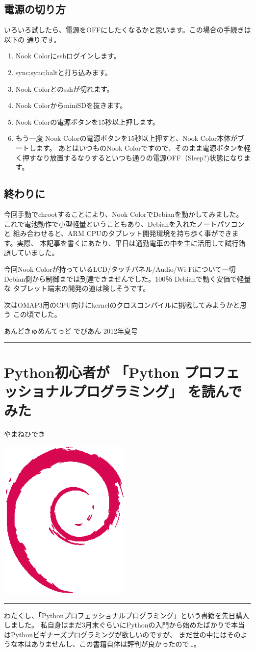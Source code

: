 \documentclass[mingoth,a4paper]{jsarticle}
\renewcommand{\dancersection}[2]{%
\newpage
あんどきゅめんてっど でびあん 2012年夏号
%
\vspace{0.1mm}\\
{\color{dancerdarkblue}\rule{\hsize}{2mm}}

%
%
\begin{minipage}[t]{0.6\hsize}
\color{dancerdarkblue}
\vspace{1cm}
\section{#1}
\hfill{}#2\\
\end{minipage}
\begin{minipage}[t]{0.4\hsize}
\vspace{-2cm}
\hfill{}\includegraphics[height=8cm]{image200502/openlogo-nd.eps}\\
\vspace{-5cm}
\end{minipage}
%
{\color{dancerlightblue}\rule{0.66\hsize}{2mm}}
%
\vspace{2cm}
}
\begin{document}
\subsection{電源の切り方}

いろいろ試したら、電源をOFFにしたくなるかと思います。この場合の手続きは以下の
通りです。

\begin{enumerate}
\item Nook Colorにsshログインします。
\item sync;sync;haltと打ち込みます。
\item Nook Colorとのsshが切れます。
\item Nook ColorからminiSDを抜きます。
\item Nook Colorの電源ボタンを15秒以上押します。
\item もう一度 Nook Colorの電源ボタンを15秒以上押すと、Nook Color本体がブートします。
あとはいつものNook Colorですので、そのまま電源ボタンを軽く押すなり放置するなりするといつも通りの電源OFF（Sleep?)状態になります。
\end{enumerate}

\subsection{終わりに}

今回手動でchrootすることにより、Nook ColorでDebianを動かしてみました。
これで電池動作で小型軽量ということもあり、Debianを入れたノートパソコンと
組み合わせると、ARM CPUのタブレット開発環境を持ち歩く事ができます。実際、
本記事を書くにあたり、平日は通勤電車の中を主に活用して試行錯誤していました。

今回Nook Colorが持っているLCD/タッチパネル/Audio/Wi-Fiについて一切
Debian側から制御までは到達できませんでした。100％ Debianで動く安価で軽量な
タブレット端末の開発の道は険しそうです。

次はOMAP3用のCPU向けにkernelのクロスコンパイルに挑戦してみようかと思う
この頃でした。

\clearpage


\dancersection{Python初心者が 「Python プロフェッショナルプログラミング」 を読んでみた}{やまねひでき}
\label{sec:python-professional-programing}

わたくし、「Pythonプロフェッショナルプログラミング」という書籍を先日購入しました。
私自身はまだ3月末ぐらいにPythonの入門から始めたばかりで本当はPythonビギナーズプログラミングが欲しいのですが、
まだ世の中にはそのような本はありませんし、この書籍自体は評判が良かったので…。
\end{document}

